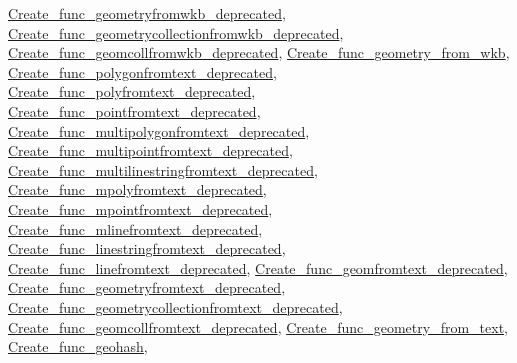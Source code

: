 \mbox{\hyperlink{classCreate__func__geometryfromwkb__deprecated_ad703efb8f0aeacc91ff8d08301a55dd7}{Create\+\_\+func\+\_\+geometryfromwkb\+\_\+deprecated}}, \mbox{\hyperlink{classCreate__func__geometrycollectionfromwkb__deprecated_a143fde30a0fff5b0f79456a9ea9c5ae0}{Create\+\_\+func\+\_\+geometrycollectionfromwkb\+\_\+deprecated}}, \mbox{\hyperlink{classCreate__func__geomcollfromwkb__deprecated_a37dd2357ed2c8bb8f97450aaaa47c158}{Create\+\_\+func\+\_\+geomcollfromwkb\+\_\+deprecated}}, \mbox{\hyperlink{classCreate__func__geometry__from__wkb_a2dc1bd3f589aca8e3fcab072829d7886}{Create\+\_\+func\+\_\+geometry\+\_\+from\+\_\+wkb}}, \mbox{\hyperlink{classCreate__func__polygonfromtext__deprecated_ae42cae5e01546d848a75369762244ca5}{Create\+\_\+func\+\_\+polygonfromtext\+\_\+deprecated}}, \mbox{\hyperlink{classCreate__func__polyfromtext__deprecated_ae2d1f5b987f4eee048383dff2fbb7d92}{Create\+\_\+func\+\_\+polyfromtext\+\_\+deprecated}}, \mbox{\hyperlink{classCreate__func__pointfromtext__deprecated_a15b37997c76797c4da46be0fd82afae1}{Create\+\_\+func\+\_\+pointfromtext\+\_\+deprecated}}, \mbox{\hyperlink{classCreate__func__multipolygonfromtext__deprecated_aa97a2a418f12fe63eb87ac20182a7790}{Create\+\_\+func\+\_\+multipolygonfromtext\+\_\+deprecated}}, \mbox{\hyperlink{classCreate__func__multipointfromtext__deprecated_a0855754fc0c084171c2acc7500603cf3}{Create\+\_\+func\+\_\+multipointfromtext\+\_\+deprecated}}, \mbox{\hyperlink{classCreate__func__multilinestringfromtext__deprecated_a8994e5152dc5e7d389dab02346f5e1eb}{Create\+\_\+func\+\_\+multilinestringfromtext\+\_\+deprecated}}, \mbox{\hyperlink{classCreate__func__mpolyfromtext__deprecated_af27e8741d038b263573cd51ad78608c3}{Create\+\_\+func\+\_\+mpolyfromtext\+\_\+deprecated}}, \mbox{\hyperlink{classCreate__func__mpointfromtext__deprecated_a51dc673c0da67b8c4cc35ede863275aa}{Create\+\_\+func\+\_\+mpointfromtext\+\_\+deprecated}}, \mbox{\hyperlink{classCreate__func__mlinefromtext__deprecated_ac980d27d0c98fd6a1957cdef2642f1dd}{Create\+\_\+func\+\_\+mlinefromtext\+\_\+deprecated}}, \mbox{\hyperlink{classCreate__func__linestringfromtext__deprecated_ada58651e2d023a4363d088fd5370f8af}{Create\+\_\+func\+\_\+linestringfromtext\+\_\+deprecated}}, \mbox{\hyperlink{classCreate__func__linefromtext__deprecated_aa8e6c707d1a042ae6b57389b005f7e35}{Create\+\_\+func\+\_\+linefromtext\+\_\+deprecated}}, \mbox{\hyperlink{classCreate__func__geomfromtext__deprecated_a48d582343e1887825483f737898d2b1f}{Create\+\_\+func\+\_\+geomfromtext\+\_\+deprecated}}, \mbox{\hyperlink{classCreate__func__geometryfromtext__deprecated_ad8af1636a8592df47f1608e873a26929}{Create\+\_\+func\+\_\+geometryfromtext\+\_\+deprecated}}, \mbox{\hyperlink{classCreate__func__geometrycollectionfromtext__deprecated_a82b818db18364fb0619ad2ca6a1551ce}{Create\+\_\+func\+\_\+geometrycollectionfromtext\+\_\+deprecated}}, \mbox{\hyperlink{classCreate__func__geomcollfromtext__deprecated_a07bdd5b9d90da6e646fd169dbdf04ea2}{Create\+\_\+func\+\_\+geomcollfromtext\+\_\+deprecated}}, \mbox{\hyperlink{classCreate__func__geometry__from__text_aa8fb6a66aca86650e8f96dafcfcd7463}{Create\+\_\+func\+\_\+geometry\+\_\+from\+\_\+text}}, \mbox{\hyperlink{classCreate__func__geohash_aba1f0c13d0c25590b1e9f591845b4e3f}{Create\+\_\+func\+\_\+geohash}}, 